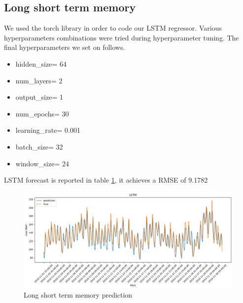 \subsection{Long short term memory}
We used the torch library in order to code our LSTM regressor.
Various hyperparameters combinations were tried during hyperparameter tuning. The final hyperparameters we set on follows.
\begin{itemize}
    \item hidden\_size= 64
    \item num\_layers= 2
    \item output\_size= 1
    \item num\_epochs= 30
    \item learning\_rate= 0.001
    \item batch\_size= 32
    \item window\_size= 24
\end{itemize}
LSTM forecast is reported in table \ref{fig:lstm_price}, it achieves a RMSE of 9.1782
\begin{figure}[!h]
    \includegraphics[width=\textwidth]{images/lstm_price.png}
    \caption{Long short term memory prediction}
    \label{fig:lstm_price}
\end{figure}

